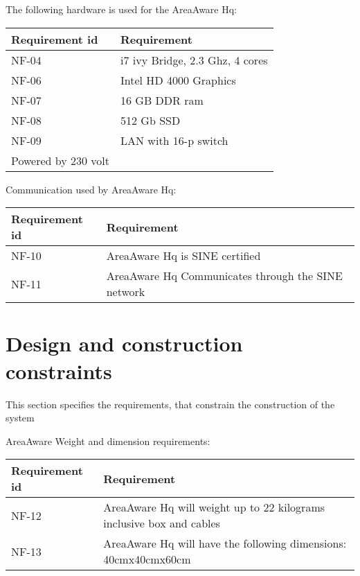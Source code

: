 The following hardware is used for the AreaAware Hq:
\begin{longtable}{| p{3.2cm} |  p{10cm} | }
	\hline
	\textbf{Requirement id} &  \textbf{Requirement } \\
	\hline
	NF-04 & i7 ivy Bridge, 2.3 Ghz, 4 cores  \\
	\hline
	NF-06 & Intel HD 4000 Graphics  \\
	\hline
	NF-07 & 16 GB DDR ram  \\
	\hline
	NF-08 &512 Gb SSD \\
	\hline
	NF-09 & LAN with 16-p switch  \\
	\hline
	Powered by 230 volt \\
	\hline
\end{longtable}

Communication used by AreaAware Hq:
\begin{longtable}{| p{3.2cm} |  p{10cm} | }
	\hline
	\textbf{Requirement id} &  \textbf{Requirement } \\
	\hline
	NF-10 & AreaAware Hq is SINE certified  \\
	\hline
	NF-11 & AreaAware Hq Communicates through the SINE network \\
	\hline
\end{longtable}





\section{Design and construction constraints}
This section specifies the requirements, that constrain the construction of the system

AreaAware Weight and dimension requirements:
\begin{longtable}{| p{3.2cm} |  p{10cm} | }
	\hline
	\textbf{Requirement id} &  \textbf{Requirement } \\
	\hline
	NF-12 & AreaAware Hq will weight up to 22 kilograms inclusive box and cables  \\
	\hline
	NF-13 & AreaAware Hq will have the following dimensions: 40cmx40cmx60cm \\
	\hline
\end{longtable}


